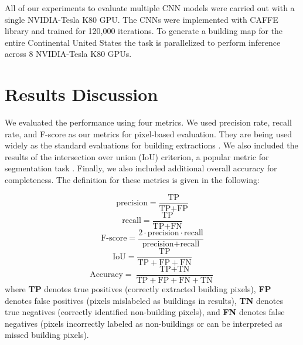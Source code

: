 \documentclass[journal]{IEEEtran}
\begin{document}
All of our experiments to evaluate multiple CNN models  were carried out with a single NVIDIA-Tesla K80 GPU. The CNNs were implemented with CAFFE library and trained for 120,000 iterations. To generate a building map for the entire Continental United States the task is parallelized to perform inference across 8 NVIDIA-Tesla K80 GPUs.



\section{Results Discussion}
We evaluated the performance using four metrics. We used precision rate, recall rate, and F-score as our metrics for pixel-based evaluation. They are being used widely as the standard evaluations for building extractions \cite{Ngo2017,Ok2013}. We also included the results of the intersection over union (IoU) criterion, a popular metric for segmentation task \cite{ShelhamerLongDarrell2017,Maggiori2016}. Finally, we also included additional overall accuracy for completeness. The definition for these metrics is given in the following:

\begin{equation} \label{eq:precision}
\text{precision}= \frac{\text{TP}}{\text{TP}+\text{FP}}
\end{equation}
\begin{equation} \label{eq:recall}
\text{recall}= \frac{\text{TP}}{\text{TP}+\text{FN}}
\end{equation}
\begin{equation} \label{eq:f-score}
\text{F-score}= \frac{2\cdot\text{precision}\cdot\text{recall}}{\text{precision}+\text{recall}}
\end{equation}
\begin{equation} \label{eq:IOU}
\text{IoU}= \frac{\text{TP}}{\text{TP}+\text{FP}+\text{FN}}
\end{equation}
\begin{equation} \label{eq:OA}
\text{Accuracy}= \frac{\text{TP}+\text{TN}}{\text{TP}+\text{FP}+\text{FN}+\text{TN}}
\end{equation}
where \textbf{TP} denotes true positives (correctly extracted building pixels), \textbf{FP} denotes false positives (pixels mislabeled as buildings in results), \textbf{TN} denotes true negatives (correctly identified non-building pixels), and \textbf{FN} denotes false negatives (pixels incorrectly labeled as non-buildings or can be interpreted as missed building pixels). \\
\end{document}
